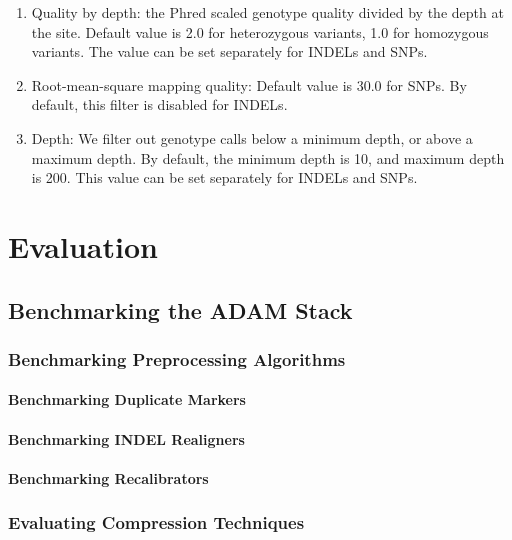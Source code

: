 \documentclass[phd]{ucbthesis}
\begin{document}
\begin{enumerate}
\item Quality by depth: the Phred scaled genotype quality divided by the depth at
the site. Default value is 2.0 for heterozygous variants, 1.0 for homozygous
variants. The value can be set separately for INDELs and SNPs.
\item Root-mean-square mapping quality: Default value is 30.0 for SNPs. By default,
this filter is disabled for INDELs.
\item Depth: We filter out genotype calls below a minimum depth, or above a maximum
depth. By default, the minimum depth is 10, and maximum depth is 200. This value
can be set separately for INDELs and SNPs.
\end{enumerate}

\part{Evaluation}

\chapter{Benchmarking the \textsc{ADAM} Stack}
\label{chap:benchmarking}

\section{Benchmarking Preprocessing Algorithms}
\label{sec:benchmarking-preprocessing}

\subsection{Benchmarking Duplicate Markers}
\label{sec:benchmarking-duplicate-markers}

\subsection{Benchmarking INDEL Realigners}
\label{sec:benchmarking-indel-realigners}

\subsection{Benchmarking Recalibrators}
\label{sec:benchmarking-recalibrators}

\section{Evaluating Compression Techniques}
\label{sec:compression}
\end{document}
